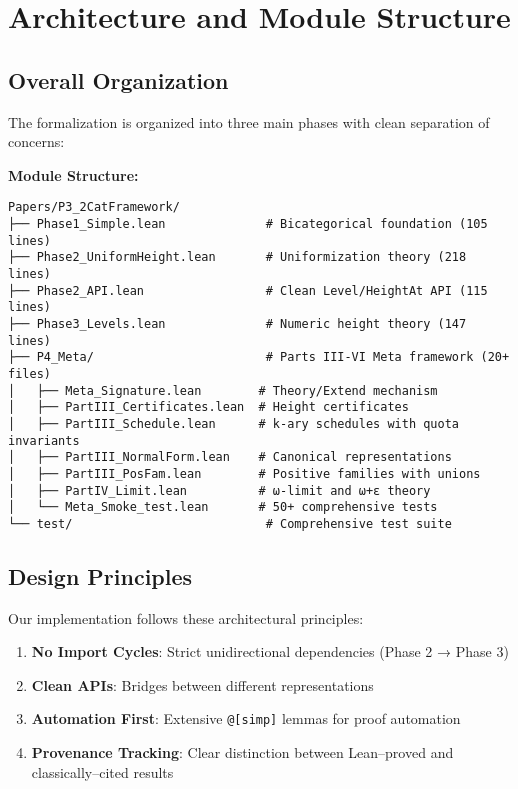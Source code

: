 \documentclass[11pt]{article}
\theoremstyle{definition}
\theoremstyle{remark}
\begin{document}
\section{Architecture and Module Structure}

\subsection{Overall Organization}

The formalization is organized into three main phases with clean separation of concerns:

\begin{mdframed}[style=technical]
\textbf{Module Structure:}
\begin{lstlisting}[language={}]
Papers/P3_2CatFramework/
├── Phase1_Simple.lean              # Bicategorical foundation (105 lines)
├── Phase2_UniformHeight.lean       # Uniformization theory (218 lines)
├── Phase2_API.lean                 # Clean Level/HeightAt API (115 lines)
├── Phase3_Levels.lean              # Numeric height theory (147 lines)
├── P4_Meta/                        # Parts III-VI Meta framework (20+ files)
│   ├── Meta_Signature.lean        # Theory/Extend mechanism
│   ├── PartIII_Certificates.lean  # Height certificates
│   ├── PartIII_Schedule.lean      # k-ary schedules with quota invariants
│   ├── PartIII_NormalForm.lean    # Canonical representations
│   ├── PartIII_PosFam.lean        # Positive families with unions
│   ├── PartIV_Limit.lean          # ω-limit and ω+ε theory
│   └── Meta_Smoke_test.lean       # 50+ comprehensive tests
└── test/                           # Comprehensive test suite
\end{lstlisting}
\end{mdframed}

\subsection{Design Principles}

Our implementation follows these architectural principles:

\begin{enumerate}
\item \textbf{No Import Cycles}: Strict unidirectional dependencies (Phase 2 → Phase 3)
\item \textbf{Clean APIs}: Bridges between different representations
\item \textbf{Automation First}: Extensive \texttt{@[simp]} lemmas for proof automation
\item \textbf{Provenance Tracking}: Clear distinction between Lean--proved and classically--cited results
\end{enumerate}
\end{document}
